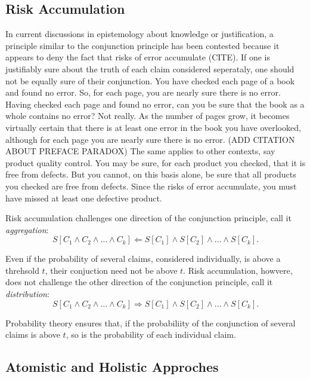 \documentclass[10pt,dvipsnames,enabledeprecatedfontcommands]{scrartcl}
\begin{document}
\subsection{Risk Accumulation}\label{risk-accumulation}

In current discussions in epistemology about knowledge or justification,
a principle similar to the conjunction principle has been contested
because it appears to deny the fact that risks of error accumulate
(CITE).
If one is justifiably sure about the truth of each claim considered
seperataly, one should not be equally sure of their conjunction. You
have checked each page of a book and found no error. So, for each page,
you are nearly sure there is no error. Having checked each page and
found no error, can you be sure that the book as a whole contains no
error? Not really. As the number of pages grow, it becomes virtually
certain that there is at least one error in the book you have
overlooked, although for each page you are nearly sure there is no
error. (ADD CITATION ABOUT PREFACE PARADOX) The same applies to other
contexts, say product quality control. You may be sure, for each product
you checked, that it is free from defects. But you cannot, on this basis
alone, be sure that all products you checked are free from defects.
Since the risks of error accumulate, you must have missed at least one
defective product.

Risk accumulation challenges one direction of the conjunction principle,
call it \textit{aggregation}:
\[S[C_1 \wedge C_2  \wedge \dots \wedge  C_k] \Leftarrow S[C_1] \wedge S[C_2]  \wedge \dots \wedge  S[C_k].\]

\noindent
Even if the probability of several claims, considered individually, is
above a threhsold \(t\), their conjuction need not be above \(t\). Risk
accumulation, howvere, does not challenge the other direction of the
conjunction principle, call it \textit{distribution}:
\[S[C_1 \wedge C_2  \wedge \dots \wedge  C_k] \Rightarrow S[C_1] \wedge S[C_2]  \wedge \dots \wedge  S[C_k].\]

\noindent
Probability theory ensures that, if the probabiliity of the conjunction
of several claims is above \(t\), so is the probability of each
individual claim.

\subsection{Atomistic and Holistic
Approches}\label{atomistic-and-holistic-approches}
\end{document}
